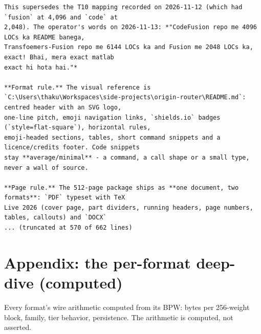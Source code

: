 \begin{verbatim}
This supersedes the T10 mapping recorded on 2026-11-12 (which had `fusion` at 4,096 and `code` at
2,048). The operator's words on 2026-11-13: *"CodeFusion repo me 4096 LOCs ka README banega,
Transfoemers-Fusion repo me 6144 LOCs ka and Fusion me 2048 LOCs ka, exact! Bhai, mera exact matlab
exact hi hota hai."*

**Format rule.** The visual reference is
`C:\Users\thaku\Workspaces\side-projects\origin-router\README.md`: centred header with an SVG logo,
one-line pitch, emoji navigation links, `shields.io` badges (`style=flat-square`), horizontal rules,
emoji-headed sections, tables, short command snippets and a licence/credits footer. Code snippets
stay **average/minimal** - a command, a call shape or a small type, never a wall of source.

**Page rule.** The 512-page package ships as **one document, two formats**: `PDF` typeset with TeX
Live 2026 (cover page, part dividers, running headers, page numbers, tables, callouts) and `DOCX`
... (truncated at 570 of 662 lines)
\end{verbatim}


\chapter{Appendix: the per-format deep-dive (computed)}

Every format's wire arithmetic computed from its BPW: bytes per 256-weight block, family,
tier behavior, persistence. The arithmetic is computed, not asserted.

